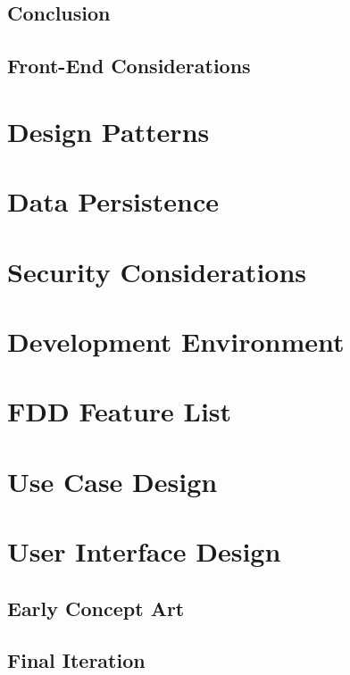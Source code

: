 \subsection{Conclusion}


\subsection{Front-End Considerations}

\section{Design Patterns}

\section{Data Persistence}

\section{Security Considerations}

\section{Development Environment}

\section{FDD Feature List}

\section{Use Case Design}

\section{User Interface Design}

\subsection{Early Concept Art}

\subsection{Final Iteration}